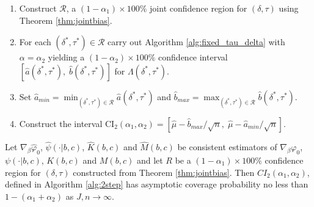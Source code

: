 \begin{alg}
\mbox{}
\begin{enumerate}
  \item Construct $\mathscr{R}$, a $(1-\alpha_1)\times 100\%$ joint confidence region for $(\delta,\tau)$ using Theorem \ref{thm:jointbias}.
  \item For each $(\delta^*,\tau^*)\in \mathscr{R}$ carry out Algorithm \ref{alg:fixed_tau_delta} with $\alpha = \alpha_2$ yielding a $(1 - \alpha_2) \times 100\%$ confidence interval $\left[ \widehat{a}(\delta^*,\tau^*),\; \widehat{b}(\delta^*,\tau^*) \right]$ for $\Lambda(\delta^*, \tau^*)$. 
  \item Set $\displaystyle \widehat{a}_{min} = \min_{(\delta^*,\tau^*)\in \mathscr{R}} \widehat{a}(\delta^*,\tau^*)$ and $\displaystyle \widehat{b}_{max} = \max_{(\delta^*,\tau^*)\in \mathscr{R}} \widehat{b}(\delta^*, \tau^*)$.
  \item Construct the interval $\mbox{CI}_2(\alpha_1, \alpha_2) = \left[ \widehat{\mu} - \widehat{b}_{max}/\sqrt{n}, \; \widehat{\mu} - \widehat{a}_{min}/\sqrt{n} \right]$.
\end{enumerate}
\label{alg:2step}
\end{alg}

\begin{thm}
\label{thm:sim}
Let $\nabla_{\beta}\widehat{\varphi}_0$, $\widehat{\psi}(\cdot|b,c)$, $\widehat{K}(b,c)$ and $\widehat{M}(b,c)$ be consistent estimators of $\nabla_\beta \varphi_0$, $\psi(\cdot|b,c)$, $K(b,c)$ and $M(b,c)$ and let $R$ be a $(1-\alpha_1)\times 100\%$ confidence region for $(\delta,\tau)$ constructed from Theorem \ref{thm:jointbias}.
Then $CI_2(\alpha_1, \alpha_2)$, defined in Algorithm \ref{alg:2step} has asymptotic coverage probability no less than $1-\left( \alpha_1 + \alpha_2 \right)$ as $J,n\rightarrow \infty$. 
\end{thm}

